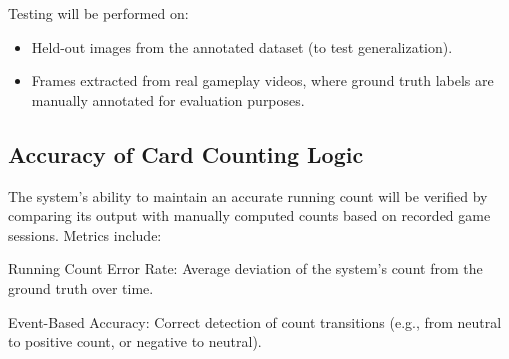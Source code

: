 \documentclass{article}
\begin{document}
Testing will be performed on:

\begin{itemize}
	\item Held-out images from the annotated dataset (to test generalization).
	\item Frames extracted from real gameplay videos, where ground truth labels are manually annotated for evaluation purposes.
\end{itemize}

\subsection*{Accuracy of Card Counting Logic}

The system’s ability to maintain an accurate running count will be verified by comparing its output with manually computed counts based on recorded game sessions. Metrics include:

Running Count Error Rate: Average deviation of the system's count from the ground truth over time.

Event-Based Accuracy: Correct detection of count transitions (e.g., from neutral to positive count, or negative to neutral).

\nocite{*}



\end{document}
